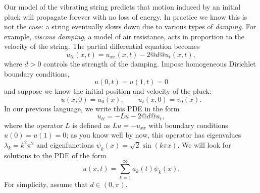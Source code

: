 Our model of the vibrating string predicts that motion induced by an 
initial pluck will propagate forever with no loss of energy.
In practice we know this is not the case: a string 
eventually slows down due to various types of \emph{damping}.
For example, \emph{viscous damping}, a model of air resistance,
acts in proportion to the velocity of the string.
The partial differential equation becomes
\[ u_{tt}(x,t) = u_{xx}(x,t) - 2@d @u_t(x,t),\]
where $d> 0$ controls the strength of the damping.
Impose homogeneous Dirichlet boundary conditions,
\[ u(0,t) = u(1,t) = 0\]
and suppose we know the initial position and velocity of the pluck:
\[ u(x,0) = u_0(x), \qquad u_t(x,0) = v_0(x).\]
In our previous language, we write this PDE in the form 
\[ u_{tt} = -L u - 2@d@u_t,\]
where the operator $L$ is defined as $Lu = -u_{xx}$ with
boundary conditions $u(0)=u(1)=0$; as you know well by now,
this operator has eigenvalues $\lambda_k = k^2\pi^2$
and eigenfunctions $\psi_k(x) = \sqrt{2} \sin(k \pi x)$.
We will look for solutions to the PDE of the form
\[ u(x,t) = \sum_{k=1}^\infty a_k(t) \psi_k(x).\]
For simplicity, assume that $d\in(0,\pi)$.

